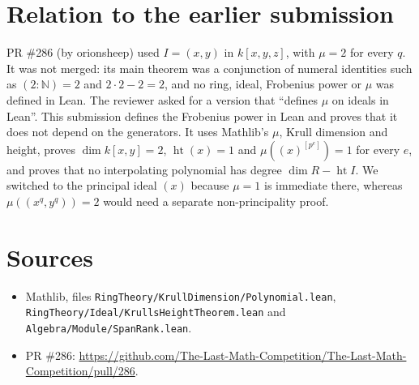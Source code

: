 \documentclass[11pt]{article}
\theoremstyle{definition}
\begin{document}
\section{Relation to the earlier submission}
PR \#286 (by orionsheep) used $I=(x,y)$ in $k[x,y,z]$, with $\mu=2$ for every $q$. It was not merged:
its main theorem was a conjunction of numeral identities such as $(2:\mathbb N)=2$ and $2\cdot2-2=2$, and
no ring, ideal, Frobenius power or $\mu$ was defined in Lean. The reviewer asked for a version that
``defines $\mu$ on ideals in Lean''. This submission defines the Frobenius power in Lean and proves that
it does not depend on the generators. It uses Mathlib's $\mu$, Krull dimension and height, proves
$\dim k[x,y]=2$, $\operatorname{ht}(x)=1$ and $\mu((x)^{[p^e]})=1$ for every $e$, and proves that no
interpolating polynomial has degree $\dim R-\operatorname{ht}I$. We switched to the principal ideal $(x)$
because $\mu=1$ is immediate there, whereas $\mu((x^q,y^q))=2$ would need a separate non-principality
proof.

\section*{Sources}
\begin{itemize}
\item Mathlib, files \nolinkurl{RingTheory/KrullDimension/Polynomial.lean},
\nolinkurl{RingTheory/Ideal/KrullsHeightTheorem.lean} and \nolinkurl{Algebra/Module/SpanRank.lean}.
\item PR \#286: \url{https://github.com/The-Last-Math-Competition/The-Last-Math-Competition/pull/286}.
\end{itemize}
\end{document}
